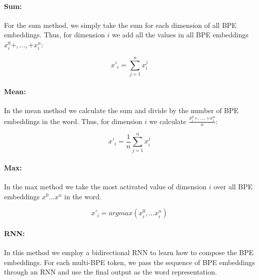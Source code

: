 \documentclass[11pt]{article}
\begin{document}
	\paragraph{Sum:} For the sum method, we simply take the sum for each dimension of all BPE embeddings. Thus, for dimension $i$ we add all the values in all BPE embeddings $x_i^0 + ,..., + x_i^n$:
	
	\begin{equation}
	    x'_{i} = \sum_{j=1}^{n} x_i^j
	\end{equation}
	
		
	
	\paragraph{Mean:} In the mean method we calculate the sum and divide by the number of BPE embeddings in the word. Thus, for dimension $i$ we calculate $\frac{x_i^0 + ,..., + x_i^n}{n}$: 
	
    	\begin{equation}
    	    x'_{i} = \frac{1}{n}\sum_{j=1}^{n} x_i^j
    	\end{equation}
	
	\paragraph{Max:} In the max method we take the most activated value of dimension $i$ over all BPE embeddings $x^0...x^n$ in the word. 
	
		\begin{equation}
			x'_i = {argmax(x_i^0,...x_i^n)}
		\end{equation}
	
	\paragraph{RNN:} In this method we employ a bidirectional RNN to learn how to compose the BPE embeddings. For each multi-BPE token, we pass the sequence of BPE embeddings through an RNN and use the final output as the word representation.
	
\end{document}

